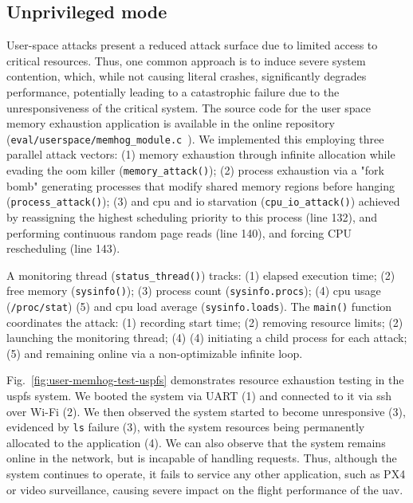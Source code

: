 \subsection{Unprivileged mode}
\label{sec:unprivileged-mode}
User-space attacks present a reduced attack surface due to limited access to
critical resources. Thus, one common approach is to induce severe system
contention, which, while not causing literal crashes, significantly degrades performance,
potentially leading to a catastrophic failure due to the unresponsiveness of the
critical system.
The source code for the user space memory exhaustion application is available in the
online repository
(\lstinline{eval/userspace/memhog_module.c}~\cite{thesis-sw-github}). We
implemented this employing three parallel attack vectors:
(1) memory exhaustion
through infinite allocation while evading the \gls{oom} killer
(\lstinline{memory_attack()});
(2) process exhaustion via a "fork bomb" generating processes that modify shared
memory regions before hanging (\lstinline{process_attack()});
(3) and \gls{cpu} and \gls{io} starvation (\lstinline{cpu_io_attack()}) achieved
by reassigning the highest scheduling priority to this process (line 132), and
performing continuous random page reads (line 140), and forcing CPU rescheduling
(line 143).

A monitoring thread (\lstinline{status_thread()}) tracks: (1) elapsed execution
time; (2) free memory (\lstinline{sysinfo()});
(3) process count (\lstinline{sysinfo.procs});
(4) \gls{cpu} usage (\lstinline{/proc/stat})
(5) and \gls{cpu} load average (\lstinline{sysinfo.loads}).
The \lstinline{main()} function coordinates the attack: (1) recording start
time; (2) removing resource limits; (2) launching the monitoring thread; (4) (4)
initiating a child process for each attack; (5) and remaining online via a
non-optimizable infinite loop.

Fig.~\ref{fig:user-memhog-test-uspfs} demonstrates resource exhaustion testing in the
\gls{uspfs} system. We booted the system via UART (1) and connected to it via
\gls{ssh} over Wi-Fi (2). We then observed the system started to become unresponsive
(3), evidenced by \lstinline{ls} failure (3), with the system resources being
permanently allocated to the application (4). We can also observe that the
system remains online in the network, but is incapable of handling
requests. Thus, although the system continues to operate, it fails to service
any other application, such as PX4 or video surveillance, causing severe impact
on the flight performance of the \gls{uav}.

